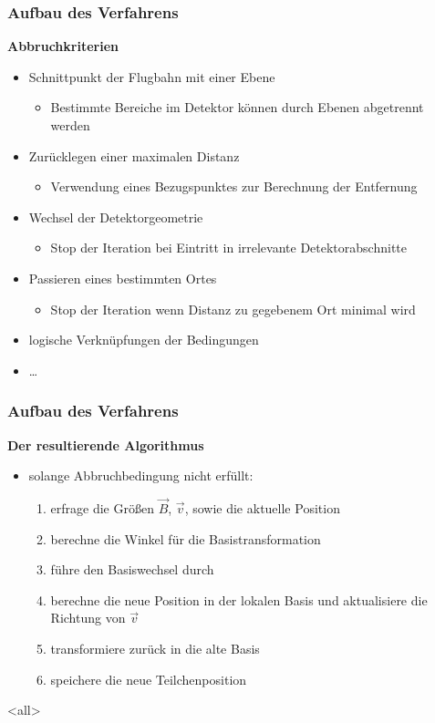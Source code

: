 \begin{frame}
  \frametitle{Aufbau des Verfahrens}
  \onslide<+->
  \textbf{Abbruchkriterien}
  \begin{itemize}
    \item<+-> Schnittpunkt der Flugbahn mit einer Ebene
      \begin{itemize}
        \item<+-> Bestimmte Bereiche im Detektor k\"onnen durch Ebenen abgetrennt werden
      \end{itemize}
    \item<+-> Zur\"ucklegen einer maximalen Distanz
      \begin{itemize}
        \item<+-> Verwendung eines Bezugspunktes zur Berechnung der Entfernung
      \end{itemize}
    \item<+-> Wechsel der Detektorgeometrie
      \begin{itemize}
        \item<+-> Stop der Iteration bei Eintritt in irrelevante Detektorabschnitte
      \end{itemize}
    \item<+-> Passieren eines bestimmten Ortes
      \begin{itemize}
        \item<+-> Stop der Iteration wenn Distanz zu gegebenem Ort minimal wird
      \end{itemize}
    \item<+-> logische Verkn\"upfungen der Bedingungen
    \item<+-> \ldots
  \end{itemize}
\end{frame}

\begin{frame}
  \frametitle{Aufbau des Verfahrens}
  \onslide<+->
  \textbf{Der resultierende Algorithmus}\\
  \begin{itemize}
  \item<+-> solange Abbruchbedingung nicht erf\"ullt:
    \begin{enumerate}
    \item<+-> erfrage die Gr\"o{\ss}en \(\vec{B}\), \(\vec{v}\), sowie die aktuelle Position
    \item<+-> berechne die Winkel f\"ur die Basistransformation
    \item<+-> f\"uhre den Basiswechsel durch
    \item<+-> berechne die neue Position in der lokalen Basis und aktualisiere die Richtung von \(\vec{v}\)
    \item<+-> transformiere zur\"uck in die alte Basis
    \item<+-> speichere die neue Teilchenposition
    \end{enumerate}
  \end{itemize}
\end{frame}

\mode<all>
